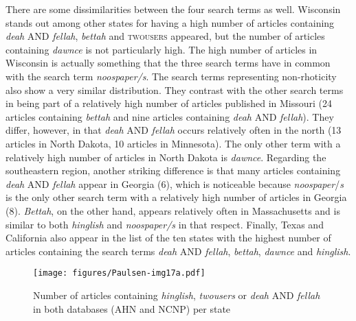 There are some dissimilarities between the four search terms as well. Wisconsin stands out among other states for having a high number of articles containing \emph{deah} AND \emph{fellah}, \emph{bettah} and \textsc{twousers} appeared, but the number of articles containing \emph{dawnce} is not particularly high. The high number of articles in Wisconsin is actually something that the three search terms have in common with the search term \emph{noospaper/s}. The search terms representing non-rhoticity also show a very similar distribution. They contrast with the other search terms in being part of a relatively high number of articles published in Missouri (24 articles containing \emph{bettah} and nine articles containing \emph{deah} AND \emph{fellah}). They differ, however, in that \emph{deah} AND \emph{fellah} occurs relatively often in the north (13 articles in North Dakota, 10 articles in Minnesota). The only other term with a relatively high number of articles in North Dakota is \emph{dawnce}. Regarding the southeastern region, another striking difference is that many articles containing \emph{deah} AND \emph{fellah} appear in Georgia (6), which is noticeable because \emph{noospaper}/\emph{s} is the only other search term with a relatively high number of articles in Georgia (8). \emph{Bettah}, on the other hand, appears relatively often in Massachusetts and is similar to both \emph{hinglish} and \emph{noospaper/s} in that respect. Finally, Texas and California also appear in the list of the ten states with the highest number of articles containing the search terms \emph{deah} AND \emph{fellah}, \emph{bettah}, \emph{dawnce} and \emph{hinglish}.


\begin{figure}
\texttt{[image: figures/Paulsen-img17a.pdf]}
\caption{
Number of articles containing \textit{hinglish}, \textit{twousers} or \textit{deah} AND \textit{fellah} in both databases (AHN and NCNP) per state
}
\label{fig:key:17a}
\end{figure}

